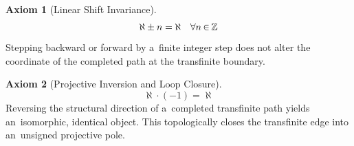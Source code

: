 \documentclass[11pt,a4paper]{article}
\newcommand\nfex{\hspace{-0.2ex}} %
\newcommand\cin{\nfex\in\nfex}
\theoremstyle{definition}
\theoremstyle{noperiod}
\newtheorem{axiom}{Axiom}[section]
\begin{document}
\begin{axiom}[Linear Shift Invariance]
\begin{equation}
\aleph \pm n = \aleph \quad \forall n \cin \mathbb{Z}
\end{equation}
Stepping backward or forward by a~finite integer step does not alter the coordinate of the completed path at the transfinite boundary.
\end{axiom}

\begin{axiom}[Projective Inversion and Loop Closure]
\begin{equation}
\aleph \cdot (-1) = \aleph
\end{equation}
Reversing the structural direction of a~completed transfinite path yields an~isomorphic, identical object. This topologically closes the transfinite edge into an~unsigned projective pole.
\end{axiom}




\end{document}
